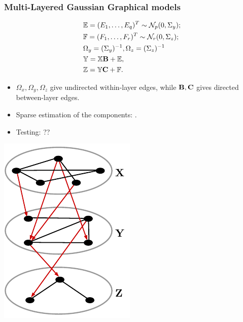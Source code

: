 \documentclass[10pt]{beamer}
\theoremstyle{definition}
\begin{document}
\begin{frame}
\frametitle{Multi-Layered Gaussian Graphical models}

\begin{minipage}{.49\textwidth}
%
{\color{black}
\begin{align*}
& {\mathbb{E}} = (E_1, \ldots, E_q)^T \sim {\cal{N}}_p (0, \Sigma_y);\\
& {\mathbb{F}} = (F_1, \ldots, F_r)^T \sim {\cal{N}}_r (0, \Sigma_z);\\
& \Omega_y = (\Sigma_y)^{-1}, \Omega_z = (\Sigma_z)^{-1}\\
& {\mathbb{Y}} = {\mathbb{X}} {\mathbf{B}} + {\mathbb{E}},\\
& {\mathbb{Z}} = {\mathbb{Y}} {\mathbf{C}} + {\mathbb{F}}.\\
\end{align*}}
%

\vspace{-3em}
\begin{itemize}
\item $\Omega_x, \Omega_y, \Omega_z$ give undirected within-layer edges, while ${\mathbf{B}}, {\mathbf{C}}$ gives directed between-layer edges.
\vspace{1em}

\item Sparse estimation of the components: {\colr\cite{LinEtal16}}.

\item Testing: {\colrbf ??}
\end{itemize}
\end{minipage}
%
\begin{minipage}{.49\textwidth}
\centering
\includegraphics[height=.7\textheight]{multilayer.pdf}
\end{minipage}

\end{frame}
\end{document}
